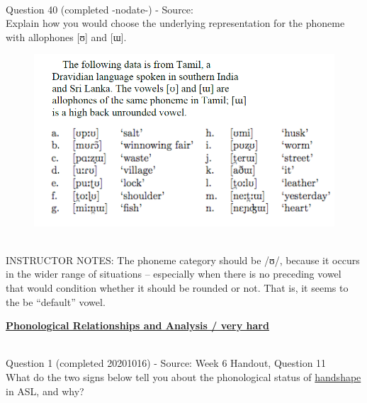 \documentclass[12pt]{article}
\begin{document}
~\\

{\large Question 40} (completed -nodate-) - Source: \\

Explain how you would choose the underlying representation for the phoneme with allophones [ʊ] and [ɯ].\\

\begin{figure}[H]
\includegraphics{../images/tamil.png}
\end{figure}

~\\
INSTRUCTOR NOTES: The phoneme category should be /ʊ/, because it occurs in the wider range of situations – especially when there is no preceding vowel that would condition whether it should be rounded or not. That is, it seems to the be “default” vowel.


\newpage\textbf{\underline{\huge Phonological Relationships and Analysis / very hard\\}}

~\\

{\large Question 1} (completed 20201016) - Source: Week 6 Handout, Question 11\\

What do the two signs below tell you about the phonological status of \underline{handshape} in ASL, and why?\\
\end{document}
